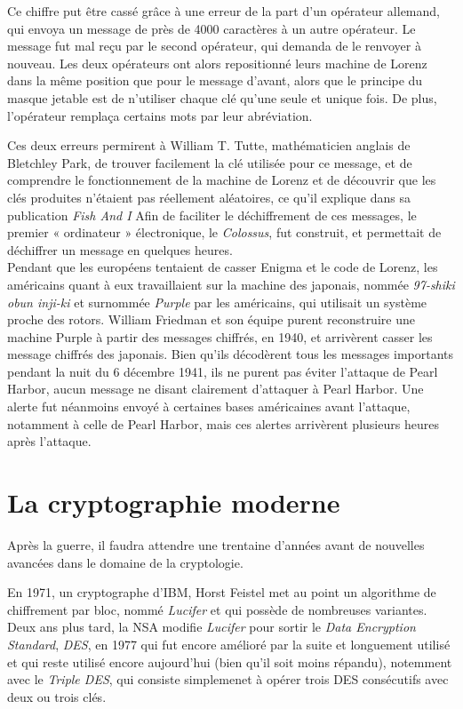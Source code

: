 Ce chiffre put être cassé grâce à une erreur de la part d'un opérateur
allemand, qui envoya un message de près de 4000 caractères à un autre
opérateur. Le message fut mal reçu par le second opérateur, qui
demanda de le renvoyer à nouveau. Les deux opérateurs ont alors
repositionné leurs machine de Lorenz dans la même position que pour
le message d'avant, alors que le principe du masque jetable est de
n'utiliser chaque clé qu'une seule et unique fois. De plus,
l'opérateur remplaça certains mots par leur abréviation. 

Ces deux erreurs permirent à William T. Tutte, mathématicien anglais
de Bletchley Park, de trouver
facilement la clé utilisée pour ce message, et de comprendre le
fonctionnement de la machine de Lorenz et de découvrir que les clés
produites n'étaient pas réellement aléatoires, ce qu'il explique dans
sa publication \emph{Fish And I}\cite{FISHAndI}
Afin de faciliter le déchiffrement de ces messages, le
premier « ordinateur » électronique, le \emph{Colossus}, fut
construit, et permettait de déchiffrer un message en quelques
heures. \\ 

Pendant que les européens tentaient de casser Enigma et le code de
Lorenz, les américains quant à eux travaillaient sur la machine des
japonais, nommée \emph{97-shiki obun inji-ki} et surnommée \emph{Purple}
par les américains, qui utilisait un système proche des
rotors. William Friedman et son équipe purent reconstruire une machine
Purple à partir des messages chiffrés, en 1940, et arrivèrent casser
les message chiffrés des japonais. Bien qu'ils décodèrent tous les
messages importants pendant la nuit du 6 décembre 1941, ils ne purent
pas éviter l'attaque de Pearl Harbor, aucun message ne disant
clairement d'attaquer à Pearl Harbor. Une alerte fut néanmoins envoyé
à certaines bases américaines avant l'attaque, notamment à celle de
Pearl Harbor, mais ces alertes arrivèrent plusieurs heures après
l'attaque.

\section{La cryptographie moderne}
Après la guerre, il faudra attendre une trentaine d'années avant de
nouvelles avancées dans le domaine de la cryptologie. 

En 1971, un cryptographe d'IBM, Horst Feistel met au point un
algorithme de chiffrement par bloc, nommé \emph{Lucifer} et qui
possède de nombreuses variantes. Deux ans plus tard, la NSA modifie
\emph{Lucifer} pour sortir le \emph{Data Encryption Standard},
\emph{DES}, en 1977 qui fut encore amélioré par la suite et longuement
utilisé et qui reste utilisé encore aujourd'hui (bien qu'il soit moins
répandu), notemment avec le \emph{Triple DES}, qui consiste
simplemenet à opérer trois DES consécutifs avec deux ou trois clés. %

